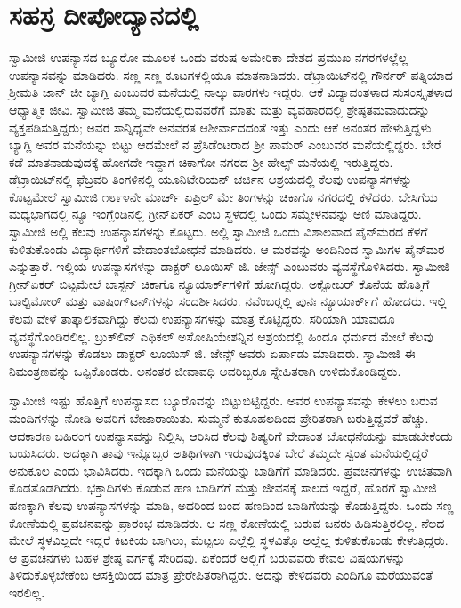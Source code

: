 
\chapter{ಸಹಸ್ರ ದೀಪೋದ್ಯಾನದಲ್ಲಿ}

 ಸ್ವಾಮೀಜಿ ಉಪನ್ಯಾಸದ ಬ್ಯೂರೋ ಮೂಲಕ ಒಂದು ವರುಷ ಅಮೇರಿಕಾ ದೇಶದ ಪ್ರಮುಖ ನಗರಗಳಲ್ಲೆಲ್ಲ ಉಪನ್ಯಾಸವನ್ನು ಮಾಡಿದರು. ಸಣ್ಣ ಸಣ್ಣ ಕೂಟಗಳಲ್ಲಿಯೂ ಮಾತನಾಡಿದರು. ಡೆಟ್ರಾಯಿಟ್‍ನಲ್ಲಿ ಗೌರ್ನರ್ ಪತ್ನಿಯಾದ ಶ‍್ರೀಮತಿ ಜಾನ್ ಜೀ ಬ್ಯಾಗ್ಲಿ ಎಂಬುವರ ಮನೆಯಲ್ಲಿ ನಾಲ್ಕು ವಾರಗಳು ಇದ್ದರು. ಆಕೆ ವಿದ್ಯಾವಂತಳಾದ ಸುಸಂಸ್ಕೃತಳಾದ ಆಧ್ಯಾತ್ಮಿಕ ಜೀವಿ. ಸ್ವಾಮೀಜಿ ತಮ್ಮ ಮನೆಯಲ್ಲಿರುವವರೆಗೆ ಮಾತು ಮತ್ತು ವ್ಯವಹಾರದಲ್ಲಿ ಶ್ರೇಷ್ಠತಮವಾದುದನ್ನು ವ್ಯಕ್ತಪಡಿಸುತ್ತಿದ್ದರು; ಅವರ ಸಾನ್ನಿಧ್ಯವೇ ಅನವರತ ಆಶೀರ್ವಾದದಂತೆ ಇತ್ತು ಎಂದು ಆಕೆ ಅನಂತರ ಹೇಳುತ್ತಿದ್ದಳು. ಬ್ಯಾಗ್ಲಿ ಅವರ ಮನೆಯನ್ನು ಬಿಟ್ಟು ಆದಮೇಲೆ ನ ಪ್ರೆಸಿಡೆಂಟರಾದ ಶ‍್ರೀ ಪಾಮರ್ ಎಂಬುವರ ಮನೆಯಲ್ಲಿದ್ದರು. ಬೇರೆ ಕಡೆ ಮಾತನಾಡುವುದಕ್ಕೆ ಹೋಗದೇ ಇದ್ದಾಗ ಚಿಕಾಗೋ ನಗರದ ಶ‍್ರೀ ಹೇಲ್ಸ್ ಮನೆಯಲ್ಲಿ ಇರುತ್ತಿದ್ದರು. ಡೆಟ್ರಾಯಿಟ್‍ನಲ್ಲಿ ಫೆಬ್ರವರಿ ತಿಂಗಳಿನಲ್ಲಿ ಯೂನಿಟೇರಿಯನ್ ಚರ್ಚಿನ ಆಶ್ರಯದಲ್ಲಿ ಕೆಲವು ಉಪನ್ಯಾಸಗಳನ್ನು ಕೊಟ್ಟಮೇಲೆ ಸ್ವಾಮೀಜಿ ೧೮೯೪ನೇ ಮಾರ್ಚ್ ಏಪ್ರಿಲ್ ಮೇ ತಿಂಗಳನ್ನು ಚಿಕಾಗೊ ನಗರದಲ್ಲಿ ಕಳೆದರು. ಬೇಸಿಗೆಯ ಮಧ್ಯಭಾಗದಲ್ಲಿ ನ್ಯೂ ಇಂಗ್ಲೆಂಡಿನಲ್ಲಿ ಗ್ರೀನ್‍ಏಕರ್ ಎಂಬ ಸ್ಥಳದಲ್ಲಿ ಒಂದು ಸಮ್ಮೇಳನವನ್ನು ಅಣಿ ಮಾಡಿದ್ದರು. ಸ್ವಾಮೀಜಿ ಅಲ್ಲಿ ಕೆಲವು ಉಪನ್ಯಾಸಗಳನ್ನು ಕೊಟ್ಟರು. ಅಲ್ಲಿ ಸ್ವಾಮೀಜಿ ಒಂದು ವಿಶಾಲವಾದ ಪೈನ್‍ಮರದ ಕೆಳಗೆ ಕುಳಿತುಕೊಂಡು ವಿದ್ಯಾರ್ಥಿಗಳಿಗೆ ವೇದಾಂತಬೋಧನೆ ಮಾಡಿದರು. ಆ ಮರವನ್ನು ಅಂದಿನಿಂದ ಸ್ವಾಮಿಗಳ ಪೈನ್‍ಮರ ಎನ್ನುತ್ತಾರೆ. ಇಲ್ಲಿಯ ಉಪನ್ಯಾಸಗಳನ್ನು ಡಾಕ್ಟರ್ ಲೂಯಿಸ್ ಜಿ. ಜೇನ್ಸ್ ಎಂಬುವರು ವ್ಯವಸ್ಥೆಗೊಳಿಸಿದರು. ಸ್ವಾಮೀಜಿ ಗ್ರೀನ್‍ಏಕರ್ ಬಿಟ್ಟಮೇಲೆ ಬಾಸ್ಟನ್ ಚಿಕಾಗೊ ನ್ಯೂಯಾರ್ಕ್‍ಗಳಿಗೆ ಹೋಗಿದ್ದರು. ಅಕ್ಟೋಬರ್ ಕೊನೆಯ ಹೊತ್ತಿಗೆ ಬಾಲ್ಟಿಮೋರ್ ಮತ್ತು ವಾಷಿಂಗ್‍ಟನ್‍ಗಳನ್ನು ಸಂದರ್ಶಿಸಿದರು. ನವೆಂಬರ್‍ನಲ್ಲಿ ಪುನಃ ನ್ಯೂಯಾರ್ಕ್‍ಗೆ ಹೋದರು. ಇಲ್ಲಿ ಕೆಲವು ವೇಳೆ ತಾತ್ಕಾಲಿಕವಾಗಿದ್ದು ಕೆಲವು ಉಪನ್ಯಾಸಗಳನ್ನು ಮಾತ್ರ ಕೊಟ್ಟಿದ್ದರು. ಸರಿಯಾಗಿ ಯಾವುದೂ ವ್ಯವಸ್ಥೆಗೊಂಡಿರಲಿಲ್ಲ. ಬ್ರುಕ್‍ಲಿನ್ ಎಥಿಕಲ್ ಅಸೋಷಿಯೇಶನ್ನಿನ ಆಶ್ರಯದಲ್ಲಿ ಹಿಂದೂ ಧರ್ಮದ ಮೇಲೆ ಕೆಲವು ಉಪನ್ಯಾಸಗಳನ್ನು ಕೊಡಲು ಡಾಕ್ಟರ್ ಲೂಯಿಸ್ ಜಿ. ಜೇನ್ಸ್ ಅವರು ಏರ್ಪಾಡು ಮಾಡಿದರು. ಸ್ವಾಮೀಜಿ ಈ ನಿಮಂತ್ರಣವನ್ನು ಒಪ್ಪಿಕೊಂಡರು. ಅನಂತರ ಜೀವಾವಧಿ ಅವರಿಬ್ಬರೂ ಸ್ನೇಹಿತರಾಗಿ ಉಳಿದುಕೊಂಡಿದ್ದರು. 

 ಸ್ವಾಮೀಜಿ ಇಷ್ಟು ಹೊತ್ತಿಗೆ ಉಪನ್ಯಾಸದ ಬ್ಯೂರೊವನ್ನು ಬಿಟ್ಟುಬಿಟ್ಟಿದ್ದರು. ಅವರ ಉಪನ್ಯಾಸವನ್ನು ಕೇಳಲು ಬರುವ ಮಂದಿಗಳನ್ನು ನೋಡಿ ಅವರಿಗೆ ಬೇಜಾರಾಯಿತು. ಸುಮ್ಮನೆ ಕುತೂಹಲದಿಂದ ಪ್ರೇರಿತರಾಗಿ ಬರುತ್ತಿದ್ದವರೆ ಹೆಚ್ಚು. ಆದಕಾರಣ ಬಹಿರಂಗ ಉಪನ್ಯಾಸವನ್ನು ನಿಲ್ಲಿಸಿ, ಆರಿಸಿದ ಕೆಲವು ಶಿಷ್ಯರಿಗೆ ವೇದಾಂತ ಬೋಧನೆಯನ್ನು ಮಾಡಬೇಕೆಂದು ಬಯಸಿದರು. ಅದಕ್ಕಾಗಿ ತಾವು ಇನ್ನೊಬ್ಬರ ಅತಿಥಿಗಳಾಗಿ ಇರುವುದಕ್ಕಿಂತ ಬೇರೆ ತಮ್ಮದೇ ಸ್ವಂತ ಮನೆಯಲ್ಲಿದ್ದರೆ ಅನುಕೂಲ ಎಂದು ಭಾವಿಸಿದರು. ಇದಕ್ಕಾಗಿ ಒಂದು ಮನೆಯನ್ನು ಬಾಡಿಗೆಗೆ ಮಾಡಿದರು. ಪ್ರವಚನಗಳನ್ನು ಉಚಿತವಾಗಿ ಕೊಡತೊಡಗಿದರು. ಭಕ್ತಾದಿಗಳು ಕೊಡುವ ಹಣ ಬಾಡಿಗೆಗೆ ಮತ್ತು ಜೀವನಕ್ಕೆ ಸಾಲದೆ ಇದ್ದರೆ, ಹೊರಗೆ ಸ್ವಾಮೀಜಿ ಹಣಕ್ಕಾಗಿ ಕೆಲವು ಉಪನ್ಯಾಸಗಳನ್ನು ಮಾಡಿ, ಅದರಿಂದ ಬಂದ ಹಣದಿಂದ ಬಾಡಿಗೆಯನ್ನು ಕೊಡುತ್ತಿದ್ದರು. ಒಂದು ಸಣ್ಣ ಕೋಣೆಯಲ್ಲಿ ಪ್ರವಚನವನ್ನು ಪ್ರಾರಂಭ ಮಾಡಿದರು. ಆ ಸಣ್ಣ ಕೋಣೆಯಲ್ಲಿ ಬರುವ ಜನರು ಹಿಡಿಸುತ್ತಿರಲಿಲ್ಲ. ನೆಲದ ಮೇಲೆ ಸ್ಥಳವಿಲ್ಲದೇ ಇದ್ದರೆ ಕಿಟಕಿಯ ಬಾಗಿಲು, ಮೆಟ್ಟಲು ಎಲ್ಲೆಲ್ಲಿ ಸ್ಥಳವಿತ್ತೊ ಅಲ್ಲೆಲ್ಲ ಕುಳಿತುಕೊಂಡು ಕೇಳುತ್ತಿದ್ದರು. ಆ ಪ್ರವಚನಗಳು ಬಹಳ ಶ್ರೇಷ್ಠ ವರ್ಗಕ್ಕೆ ಸೇರಿದವು. ಏಕೆಂದರೆ ಅಲ್ಲಿಗೆ ಬರುವವರು ಕೇವಲ ವಿಷಯಗಳನ್ನು ತಿಳಿದುಕೊಳ್ಳಬೇಕೆಂಬ ಆಸಕ್ತಿಯಿಂದ ಮಾತ್ರ ಪ್ರೇರೇಪಿತರಾಗಿದ್ದರು. ಅದನ್ನು ಕೇಳಿದವರು ಎಂದಿಗೂ ಮರೆಯುವಂತೆ ಇರಲಿಲ್ಲ. 

